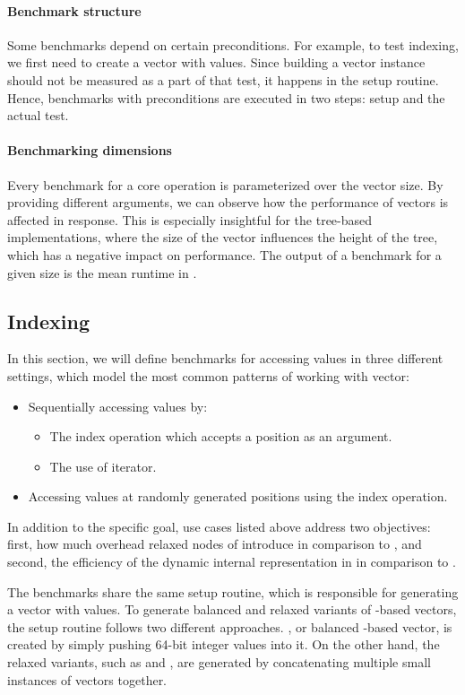 \paragraph*{Benchmark structure}
Some benchmarks depend on certain preconditions. For example, to test indexing, we first need to create a vector with values. Since building a vector instance should not be measured as a part of that test, it happens in the setup routine. Hence, benchmarks with preconditions are executed in two steps: setup and the actual test.

\paragraph*{Benchmarking dimensions}
Every benchmark for a core operation is parameterized over the vector size. By providing different arguments, we can observe how the performance of vectors is affected in response. This is especially insightful for the tree-based implementations, where the size of the vector influences the height of the tree, which has a negative impact on performance. The output of a benchmark for a given size is the mean runtime in \millis{}.

\subsection{Indexing}
In this section, we will define benchmarks for accessing values in three different settings, which model the most common patterns of working with vector:

\begin{itemize}
    \item Sequentially accessing values by:
    \begin{itemize}
        \item The index operation which accepts a position as an argument.
        \item The use of iterator.
    \end{itemize}
    \item Accessing values at randomly generated positions using the index operation.
\end{itemize}

In addition to the specific goal, use cases listed above address two objectives: first, how much overhead relaxed nodes of \rrbtree{} introduce in comparison to \rbtree{}, and second, the efficiency of the dynamic internal representation in \pvec{} in comparison to \stdvec{}.

The benchmarks share the same setup routine, which is responsible for generating a vector with values. To generate balanced and relaxed variants of \rbtree{}-based vectors, the setup routine follows two different approaches. \rbvec{}, or balanced \rbtree{}-based vector, is created by simply pushing 64-bit integer values into it. On the other hand, the relaxed variants, such as \rrbvec{} and \pvec{}, are generated by concatenating multiple small instances of vectors together.

